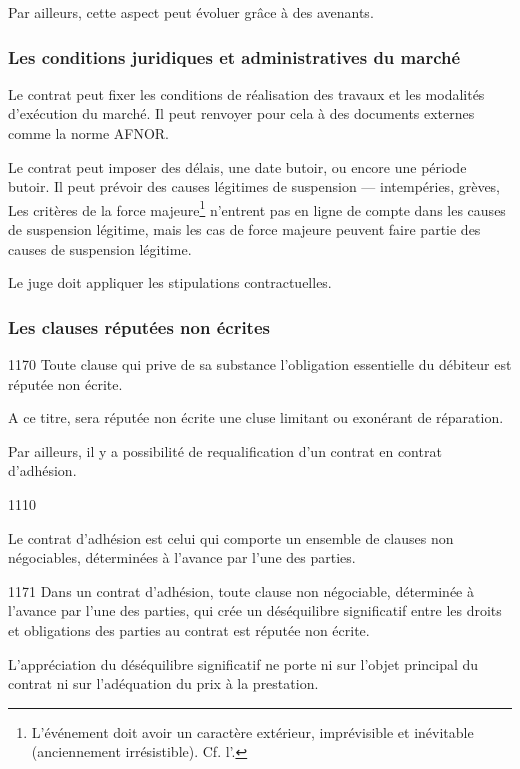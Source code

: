 			Par ailleurs, cette aspect peut évoluer grâce à des avenants.
			
			\subsubsection{Les conditions juridiques et administratives du marché}
			
			Le contrat peut fixer les conditions de réalisation des travaux et les modalités d'exécution du marché. Il peut renvoyer pour cela à des documents externes comme la norme AFNOR.
			
			Le contrat peut imposer des délais, une date butoir, ou encore une période butoir. Il peut prévoir des causes légitimes de suspension --- intempéries, grèves, \etc 
			Les critères de la force majeure\footnote{L’événement doit avoir un caractère extérieur, imprévisible et inévitable (anciennement irrésistible). Cf. l'.} n'entrent pas en ligne de compte dans les causes de suspension légitime, mais les cas de force majeure peuvent faire partie des causes de suspension légitime.
			
			Le juge doit appliquer les stipulations contractuelles.
			
			\subsubsection{Les clauses réputées non écrites}
			
			\begin{citationArticleCciv}{1170}
				Toute clause qui prive de sa substance l'obligation essentielle du débiteur est réputée non écrite.
			\end{citationArticleCciv}
		
			A ce titre, sera réputée non écrite une cluse limitant ou exonérant de réparation.
			
			\bigskip Par ailleurs, il y a possibilité de requalification d'un contrat en contrat d'adhésion.
			\begin{citationArticleCciv}{1110}
				\lips
				
				Le contrat d'adhésion est celui qui comporte un ensemble de clauses non négociables, déterminées à l'avance par l'une des parties.
			\end{citationArticleCciv}
			
		
			\begin{citationArticleCciv}{1171}
				Dans un contrat d'adhésion, toute clause non négociable, déterminée à l'avance par l'une des parties, qui crée un déséquilibre significatif entre les droits et obligations des parties au contrat est réputée non écrite.
				
				L'appréciation du déséquilibre significatif ne porte ni sur l'objet principal du contrat ni sur l'adéquation du prix à la prestation.
			\end{citationArticleCciv}
	
